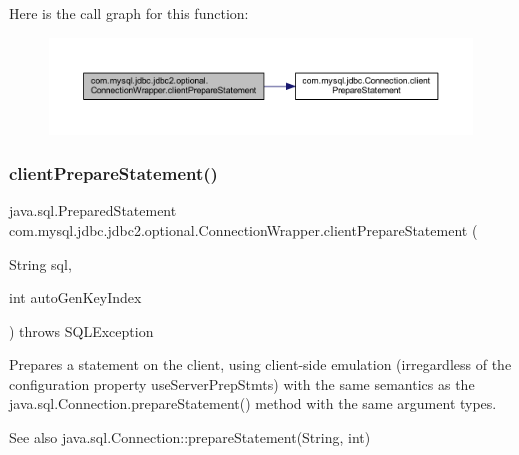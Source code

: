 Here is the call graph for this function\+:
\nopagebreak
\begin{figure}[H]
\begin{center}
\leavevmode
\includegraphics[width=350pt]{classcom_1_1mysql_1_1jdbc_1_1jdbc2_1_1optional_1_1_connection_wrapper_a8c765f36b8ba9d9a0011768a878f3275_cgraph}
\end{center}
\end{figure}
\mbox{\label{classcom_1_1mysql_1_1jdbc_1_1jdbc2_1_1optional_1_1_connection_wrapper_af706fcb5a89569df199c821c64b7d741}} 
\subsubsection{\texorpdfstring{client\+Prepare\+Statement()}{clientPrepareStatement()}\hspace{0.1cm}{\footnotesize\ttfamily [2/6]}}
{\footnotesize\ttfamily java.\+sql.\+Prepared\+Statement com.\+mysql.\+jdbc.\+jdbc2.\+optional.\+Connection\+Wrapper.\+client\+Prepare\+Statement (\begin{DoxyParamCaption}\item[{String}]{sql,  }\item[{int}]{auto\+Gen\+Key\+Index }\end{DoxyParamCaption}) throws S\+Q\+L\+Exception}

Prepares a statement on the client, using client-\/side emulation (irregardless of the configuration property \textquotesingle{}use\+Server\+Prep\+Stmts\textquotesingle{}) with the same semantics as the java.\+sql.\+Connection.\+prepare\+Statement() method with the same argument types.

\begin{DoxySeeAlso}{See also}
java.\+sql.\+Connection\+::prepare\+Statement(\+String, int) 
\end{DoxySeeAlso}


